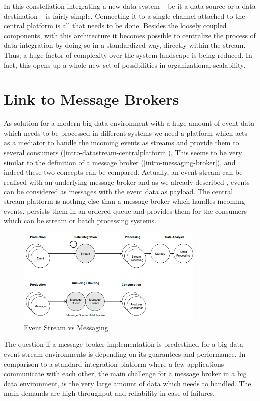 In this constellation integrating a new data system -- be it a data
source or a data destination -- is fairly simple. Connecting it to a single
channel attached to the central platform is all that needs to be done. Besides the
loosely coupled components, with this architecture it becomes possible to
centralize the process of data integration by doing so in a standardized way,
directly within the stream. Thus, a huge factor of complexity over the system
landscape is being reduced. In fact, this opens up a whole new set of
possibilities in organizational scalability. 

\newpage
\section{Link to Message Brokers}
As solution for a modern big data environment with a huge amount of event data
which needs to be processed in different systems we need a platform which acts as
a mediator to handle the incoming events as streams and provide them to several
consumers (\ref{intro-datastream-centralplatform}). This seems to be very similar to
the definition of a message broker (\ref{intro-messaging-broker}), and indeed
these two concepts can be compared. Actually, an event stream can be realised
with an underlying message broker and as we already described , events
can be considered as messages with the event data as payload. The central stream
platform is nothing else than a message broker which handles incoming events,
persists them in an ordered queue and provides them for the consumers which can be
stream or batch processing systems.
\begin{figure}[H]
    \centering
    \includegraphics[width=0.8\textwidth]{images/messaging-vs-streaming.png}
    \caption{Event Stream vs Messaging}
    \label{fig:messaging-vs-streaming}
\end{figure}
The question if a message broker implementation is predestined for a big data
event stream environments is depending on its guarantees and performance. In
comparison to a standard integration platform where a few applications communicate with each
other, the main challenge for a message broker in a big data environment, is the
very large amount of data which needs to handled. The main demands are high
throughput and reliability in case of failures. 


